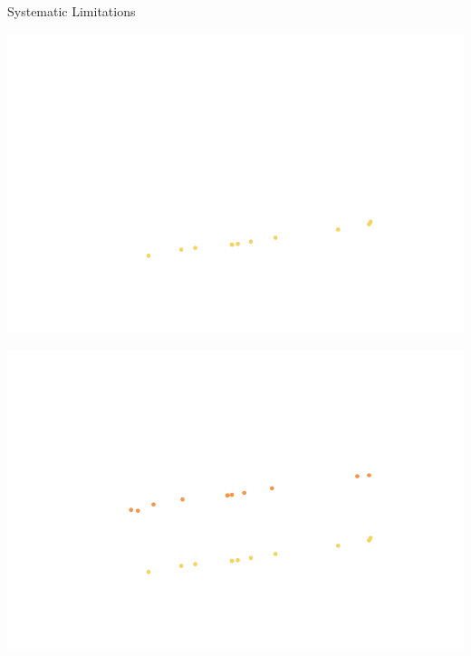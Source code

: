 \documentclass{beamer}
\begin{document}
\begin{frame}{Systematic Limitations}
    \begin{overprint}
        \begin{center}
            \includegraphics[height=0.75\textheight]{figures/spherical-power-spectra/spherical-power-spectrum-gain-errors-1.pdf}
        \end{center}
        \begin{center}
            \includegraphics[height=0.75\textheight]{figures/spherical-power-spectra/spherical-power-spectrum-gain-errors-2.pdf}
        \end{center}
        \begin{center}

\end{center}
\end{overprint}
\end{frame}
\end{document}
